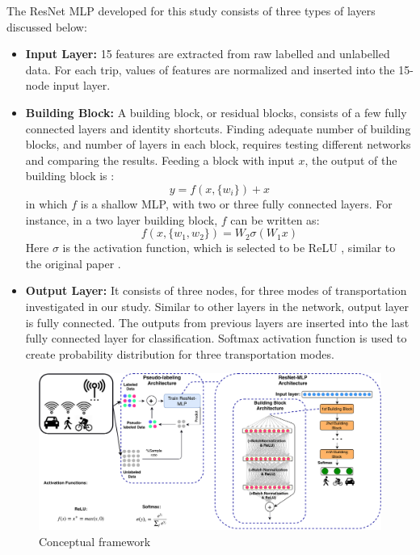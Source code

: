 The ResNet MLP developed for this study consists of three types of layers discussed below:
\begin{itemize}
    \item \textbf{Input Layer:} 15 features are extracted from raw labelled and unlabelled data. For each trip, values of features are normalized and inserted into the 15-node input layer.
    \item \textbf{Building Block:}
    A building block, or residual blocks, consists of a few fully connected layers and identity shortcuts. Finding adequate number of building blocks, and number of layers in each block, requires testing different networks and comparing the results.
    Feeding a block with input $x$, the output of the building block is \cite{he2016deep}:
    \begin{equation}
    \label{eq1}
        y= f(x,\{w_i\})+x
    \end{equation}
    in which $f$ is a shallow MLP, with two or three fully connected layers. For instance, in a two layer building block, $f$ can be written as:
    \begin{equation}
        f(x,\{w_1,w_2\})= W_2\sigma(W_1x) 
    \end{equation}
    Here $\sigma$ is the activation function, which is selected to be ReLU \cite{nair2010rectified}, similar to the original paper \cite{he2016deep}. 
    \item \textbf{Output Layer:} It consists of three nodes, for three modes of transportation investigated in our study. Similar to other layers in the network, output layer is fully connected. The outputs from previous layers are inserted into the last fully connected layer for classification. Softmax activation function is used to create probability distribution for three transportation modes.
\end{itemize}

\begin{center}
\begin{figure}
  \centering
  \includegraphics[scale=0.5]{chapter_2/figures/ResArch.pdf}%
  \caption{Conceptual framework}
  \label{fig:Resarch}
\end{figure}
\end{center}

